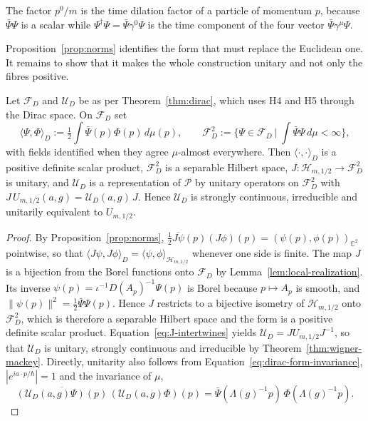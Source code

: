 \noindent The factor $p^0/m$ is the time dilation factor of a particle of momentum $p$, because $\bar{\Psi}\Psi$ is a scalar while $\Psi^\dagger\Psi=\bar{\Psi}\gamma^0\Psi$ is the time component of the four vector $\bar{\Psi}\gamma^\mu\Psi$.

Proposition~\ref{prop:norms} identifies the form that must replace the Euclidean one. It remains to show that it makes the whole construction unitary and not only the fibres positive.

\begin{theorem}\label{thm:covariant-norm}
	Let $\mathcal{F}_D$ and $\mathcal{U}_D$ be as per Theorem~\ref{thm:dirac}, which uses H4 and H5 through the Dirac space. On $\mathcal{F}_D$ set
	\begin{equation*}
		\langle\Psi,\Phi\rangle_D:=\tfrac12\int\bar{\Psi}(p)\Phi(p)\,d\mu(p),\qquad \mathcal{F}_D^2:=\Big\{\Psi\in\mathcal{F}_D\ \Big|\ \int\bar{\Psi}\Psi\,d\mu<\infty\Big\},
	\end{equation*}
	with fields identified when they agree $\mu$-almost everywhere. Then $\langle\cdot,\cdot\rangle_D$ is a positive definite scalar product, $\mathcal{F}_D^2$ is a separable Hilbert space, $J:\mathcal{H}_{m,1/2}\to\mathcal{F}_D^2$ is unitary, and $\mathcal{U}_D$ is a representation of $\mathcal{P}$ by unitary operators on $\mathcal{F}_D^2$ with $J\,U_{m,1/2}(a,g)=\mathcal{U}_D(a,g)\,J$. Hence $\mathcal{U}_D$ is strongly continuous, irreducible and unitarily equivalent to $U_{m,1/2}$.
\end{theorem}

\begin{proof}
	By Proposition~\ref{prop:norms}, $\tfrac12\overline{J\psi}(p)(J\phi)(p)=(\psi(p),\phi(p))_{\mathbb{C}^2}$ pointwise, so that $\langle J\psi,J\phi\rangle_D=\langle\psi,\phi\rangle_{\mathcal{H}_{m,1/2}}$ whenever one side is finite. The map $J$ is a bijection from the Borel functions onto $\mathcal{F}_D$ by Lemma~\ref{lem:local-realization}. Its inverse $\psi(p)=\iota^{-1}D(A_p)^{-1}\Psi(p)$ is Borel because $p\mapsto A_p$ is smooth, and $\|\psi(p)\|^2=\tfrac12\bar{\Psi}\Psi(p)$. Hence $J$ restricts to a bijective isometry of $\mathcal{H}_{m,1/2}$ onto $\mathcal{F}_D^2$, which is therefore a separable Hilbert space and the form is a positive definite scalar product. Equation~\eqref{eq:J-intertwines} yields $\mathcal{U}_D=JU_{m,1/2}J^{-1}$, so that $\mathcal{U}_D$ is unitary, strongly continuous and irreducible by Theorem~\ref{thm:wigner-mackey}. Directly, unitarity also follows from Equation~\eqref{eq:dirac-form-invariance}, $|e^{ia\cdot p/\hbar}|=1$ and the invariance of $\mu$,
	\begin{equation*}
		\overline{(\mathcal{U}_D(a,g)\Psi)(p)}\,(\mathcal{U}_D(a,g)\Phi)(p)=\bar{\Psi}(\Lambda(g)^{-1}p)\,\Phi(\Lambda(g)^{-1}p).
	\end{equation*}
\end{proof}

